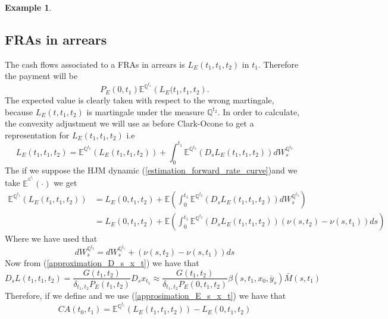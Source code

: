 \documentclass[a4paper,10pt]{article}
\newtheorem{example}[theorem]{Example}
\newcommand{\1}{\mathbf{1}}
\begin{document}
\begin{example}
 
\end{example}



\subsection{FRAs in arrears}
The cash flows associated to a FRAs in arrears is $L_{E}(t_1,t_1,t_2)$ in $t_1$. Therefore the payment will be
\begin{equation}
P_{E}(0,t_1)\mathbb{E}^{\mathbb{Q}^{t_1}}\left( L_{E}(t_1,t_1,t_2\right).
\end{equation}
The expected value is clearly taken with respect to the wrong martingale, because $L_{E}(t,t_1,t_2)$ is martingale under the measure $\mathbb{Q}^{t_2}$. In order to calculate, the convexity adjustment we will use as before Clark-Ocone to get a representation for $L_{E}(t_1,t_1,t_2)$ i.e
\begin{equation}\label{general_convexity_fras}
L_{E}(t_1,t_1,t_2) = \mathbb{E}^{\mathbb{Q}^{t_2}}\left(L_{E}(t_1,t_1,t_2) \right) + \int_{0}^{t_1} \mathbb{E}^{\mathbb{Q}^{t_2}}\left(D_s L_{E}(t_1,t_1,t_2) \right) dW^{\mathbb{Q}^{t_2}}_{s}
\end{equation}
The if we suppose the HJM dynamic (\ref{estimation_forward_rate_curve})and we take $\mathbb{E}^{^{\mathbb{Q}^{t_1}}}(\cdot)$ we get
\begin{align*}
\mathbb{E}^{\mathbb{Q}^{t_1}}\left(L_{E}(t_1,t_1,t_2) \right) &= L_{E}(0,t_1,t_2) + \mathbb{E}\left( \int_{0}^{t_1} \mathbb{E}^{\mathbb{Q}^{t_2}}\left(D_s L_{E}(t_1,t_1,t_2) \right) dW^{\mathbb{Q}^{t_2}}_{s}\right)\\
&= L_{E}(0,t_1,t_2) + \mathbb{E}\left( \int_{0}^{t_1} \mathbb{E}^{\mathbb{Q}^{t_2}}\left(D_s L_{E}(t_1,t_1,t_2) \right) (\nu(s,t_2)-\nu(s,t_1)) ds \right)
\end{align*}
Where we have used that 
\begin{equation*}
dW^{\mathbb{Q}^{t_2}}_s = dW^{\mathbb{Q}^{t_1}}_s + (\nu(s,t_2) - \nu(s,t_1)) ds 
\end{equation*}
Now from (\ref{approximation_D_s_x_t}) we have that 
\begin{equation*}
D_s L(t_1,t_1,t_2) = \frac{G(t_1,t_2)}{\delta_{t_1,t_2}P_{E}(t_1,t_2)} D_s x_{t_1} \approx \frac{G(t_1,t_2)}{\delta_{t_1,t_2}P_{E}(0,t_1,t_2)} \beta(s,t_1, x_0, \bar{y}_s)\bar{M}(s,t_1)
\end{equation*}
Therefore, if we define and we use (\ref{approsimation_E_s_x_t}) we have that
\begin{equation*}
CA(t_0,t_1) = \mathbb{E}^{\mathbb{Q}^{t_1}}\left( L_{E}\left(t_1,t_1,t_2\right)\right) - L_{E}\left(0,t_1,t_2\right)
\end{equation*}
\end{document}
